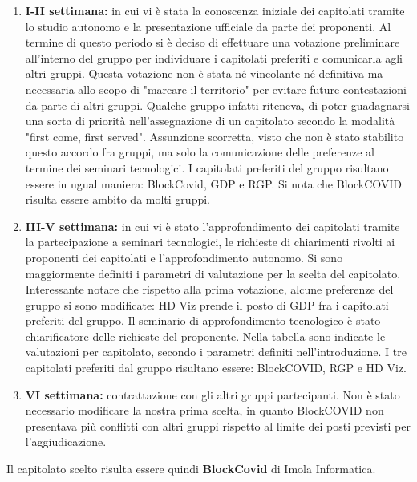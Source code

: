 \begin{enumerate}
\item \textbf{I-II settimana:} in cui vi è stata la conoscenza iniziale dei capitolati tramite lo studio autonomo e la presentazione ufficiale da parte dei proponenti. Al termine di questo periodo si è deciso di effettuare una votazione preliminare all'interno del gruppo per individuare i capitolati preferiti e comunicarla agli altri gruppi. Questa votazione non è stata né vincolante né definitiva ma necessaria allo scopo di "marcare il territorio" per evitare future contestazioni da parte di altri gruppi. Qualche gruppo infatti riteneva, di poter guadagnarsi una sorta di priorità nell'assegnazione di un capitolato secondo la modalità "first come, first served". Assunzione scorretta, visto che non è stato stabilito questo accordo fra gruppi, ma solo la comunicazione delle preferenze al termine dei seminari tecnologici. I capitolati preferiti del gruppo risultano essere in ugual maniera: BlockCovid, GDP e RGP. Si nota che BlockCOVID risulta essere ambito da molti gruppi.  
\item \textbf{III-V settimana:} in cui vi è stato l'approfondimento dei capitolati tramite la partecipazione a seminari tecnologici, le richieste di chiarimenti rivolti ai proponenti dei capitolati e l'approfondimento autonomo. Si sono maggiormente definiti i parametri di valutazione per la scelta del capitolato. Interessante notare che rispetto alla prima votazione, alcune preferenze del gruppo si sono modificate: HD Viz prende il posto di GDP fra i capitolati preferiti del gruppo. Il seminario di approfondimento tecnologico è stato chiarificatore delle richieste del proponente. Nella tabella sono indicate le valutazioni per capitolato, secondo i parametri definiti nell'introduzione. I tre capitolati preferiti dal gruppo risultano essere: BlockCOVID, RGP e HD Viz.
\item \textbf{VI settimana:} contrattazione con gli altri gruppi partecipanti. Non è stato necessario modificare la nostra prima scelta, in quanto BlockCOVID non presentava più conflitti con altri gruppi rispetto al limite dei posti previsti per l'aggiudicazione.
\end{enumerate}

Il capitolato scelto risulta essere quindi \textbf{BlockCovid} di Imola Informatica.